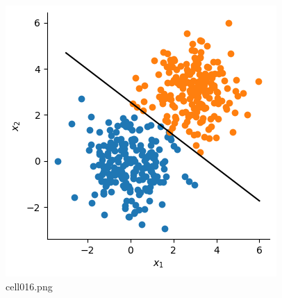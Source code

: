 \begin{figure}[ht]
	\centering
	\includegraphics[scale=0.8, max width=\linewidth]{./fig/local-learning-rule/logistic-regression-perceptron/cell016.png}
	\caption{cell016.png}
	\label{cell016.png}
\end{figure}
